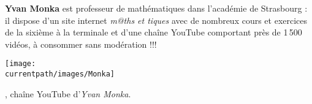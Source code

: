 \vspace*{-5mm}
\begin{changemargin}{-10mm}{-10mm}
   

   \vfill

   \begin{debat} 
      {\bf Yvan Monka} est professeur de mathématiques dans l'académie de Strasbourg : il dispose d'un site internet {\it m@ths et tiques} avec de nombreux cours et exercices de la sixième à la terminale et d'une chaîne YouTube comportant près de 1\,500 vidéos, à consommer sans modération !!! \\
      \begin{center}
         \texttt{[image: \\currentpath/images/Monka]}
      \end{center}
      \bigskip
      \begin{cadre}[B2][F4]
         \begin{center}
            , chaîne YouTube d'{\it Yvan Monka}.
         \end{center}
      \end{cadre}
   \end{debat}
\end{changemargin}